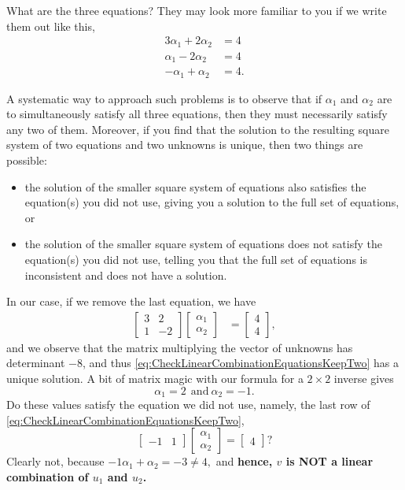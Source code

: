 What are the three equations? They may look more familiar to you if we write them out like this,
\begin{align*}
   3 \alpha_1 + 2 \alpha_2 &=4 \\
   \alpha_1 - 2 \alpha_2 &= 4\\
   -\alpha_1 + \alpha_2 &= 4.
\end{align*}

A systematic way to approach such problems is to observe that if $\alpha_1$ and $\alpha_2$ are to simultaneously satisfy all three equations, then they must necessarily satisfy any two of them. Moreover, if you find that the solution to the resulting square system of two equations and two unknowns is unique, then two things are possible:
\begin{itemize}
    \item the solution of the smaller square system of equations also satisfies the equation(s) you did not use, giving you a solution to the full set of equations, or
    \item the solution of the smaller square system of equations does not satisfy the equation(s) you did not use, telling you that the full set of equations is inconsistent and does not have a solution.
\end{itemize}

In our case, if we remove the last equation, we have 
\begin{equation}
\label{eq:CheckLinearCombinationEquationsKeepTwo}
\begin{aligned}
       \left[ \begin{array}{rr} 3 & 2\\ 1  & -2 \end{array} \right]  \left[ \begin{array}{r} \alpha_1 \\ \alpha_2 \end{array} \right] &= \left[ \begin{array}{r} 4 \\ 4   \end{array} \right],
\end{aligned}
\end{equation}
and we observe that the matrix multiplying the vector of unknowns has determinant $-8$, and thus \eqref{eq:CheckLinearCombinationEquationsKeepTwo} has a unique solution. A bit of matrix magic with our formula for a $2 \times 2$ inverse gives
 $$\alpha_1=2~~\text{and}~\alpha_2=-1. $$
 Do these values satisfy the equation we did not use, namely, the last row of \eqref{eq:CheckLinearCombinationEquationsKeepTwo},
 $$\left[ \begin{array}{rr} -1  & 1 \end{array} \right]  \left[ \begin{array}{r} \alpha_1 \\ \alpha_2 \end{array} \right] = \left[ \begin{array}{r} 4\end{array} \right]? $$
Clearly not, because $-1 \alpha_1 + \alpha_2 = -3 \neq 4,$ and
\textbf{hence, $v$ is NOT a linear combination of $u_1$ and $u_2$.} 

